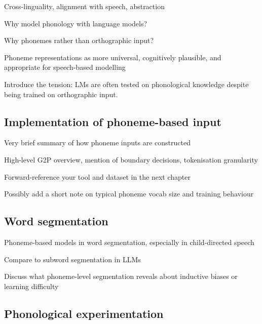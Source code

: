 Cross-linguality, alignment with speech, abstraction

Why model phonology with language models?

Why phonemes rather than orthographic input?

Phoneme representations as more universal, cognitively plausible, and appropriate for speech-based modelling

Introduce the tension: LMs are often tested on phonological knowledge despite being trained on orthographic input.

\subsection{Implementation of phoneme-based input}


Very brief summary of how phoneme inputs are constructed

High-level G2P overview, mention of boundary decisions, tokenisation granularity

Forward-reference your tool and dataset in the next chapter

Possibly add a short note on typical phoneme vocab size and training behaviour


\subsection{Word segmentation}
Phoneme-based models in word segmentation, especially in child-directed speech

Compare to subword segmentation in LLMs

Discuss what phoneme-level segmentation reveals about inductive biases or learning difficulty

\subsection{Phonological experimentation}



